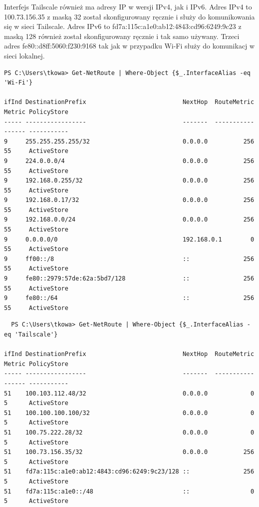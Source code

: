 \documentclass{article}
\begin{document}
Interfejs Tailscale również ma adresy IP w wersji IPv4, jak i IPv6. Adres IPv4 to 100.73.156.35 z maską 32 został skonfigurowany ręcznie i służy do komunikowania się w sieci Tailscale. Adres IPv6 to fd7a:115c:a1e0:ab12:4843:cd96:6249:9c23 z maską 128 również został skonfigurowany ręcznie i tak samo używany. Trzeci adres fe80::d8ff:5060:f230:9168 tak jak w przypadku Wi-Fi służy do komunikacj w sieci lokalnej.

\begin{lstlisting}
PS C:\Users\tkowa> Get-NetRoute | Where-Object {$_.InterfaceAlias -eq 'Wi-Fi'}

ifInd DestinationPrefix                           NextHop  RouteMetric Metric PolicyStore
----- -----------------                           -------  ----------- ------ -----------
9     255.255.255.255/32                          0.0.0.0          256 55     ActiveStore
9     224.0.0.0/4                                 0.0.0.0          256 55     ActiveStore
9     192.168.0.255/32                            0.0.0.0          256 55     ActiveStore
9     192.168.0.17/32                             0.0.0.0          256 55     ActiveStore
9     192.168.0.0/24                              0.0.0.0          256 55     ActiveStore
9     0.0.0.0/0                                   192.168.0.1        0 55     ActiveStore
9     ff00::/8                                    ::               256 55     ActiveStore
9     fe80::2979:57de:62a:5bd7/128                ::               256 55     ActiveStore
9     fe80::/64                                   ::               256 55     ActiveStore

\end{lstlisting}
\clearpage
\begin{lstlisting}
  PS C:\Users\tkowa> Get-NetRoute | Where-Object {$_.InterfaceAlias -eq 'Tailscale'}

ifInd DestinationPrefix                           NextHop  RouteMetric Metric PolicyStore
----- -----------------                           -------  ----------- ------ -----------
51    100.103.112.48/32                           0.0.0.0            0 5      ActiveStore
51    100.100.100.100/32                          0.0.0.0            0 5      ActiveStore
51    100.75.222.28/32                            0.0.0.0            0 5      ActiveStore
51    100.73.156.35/32                            0.0.0.0          256 5      ActiveStore
51    fd7a:115c:a1e0:ab12:4843:cd96:6249:9c23/128 ::               256 5      ActiveStore
51    fd7a:115c:a1e0::/48                         ::                 0 5      ActiveStore
  
\end{lstlisting}
\end{document}
